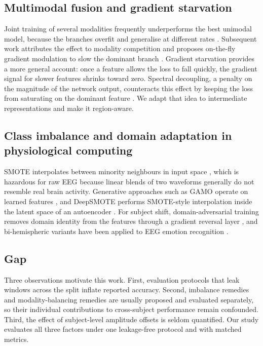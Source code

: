 \documentclass[a4paper,fleqn]{cas-sc}
\begin{document}
\subsection{Multimodal fusion and gradient starvation}
Joint training of several modalities frequently underperforms the best unimodal model, because the branches overfit and generalise at different rates \citep{wang2020makes}. Subsequent work attributes the effect to modality competition and proposes on-the-fly gradient modulation to slow the dominant branch \citep{peng2022balanced,huang2022modality}. Gradient starvation provides a more general account: once a feature allows the loss to fall quickly, the gradient signal for slower features shrinks toward zero. Spectral decoupling, a penalty on the magnitude of the network output, counteracts this effect by keeping the loss from saturating on the dominant feature \citep{pezeshki2021gradient}. We adapt that idea to intermediate representations and make it region-aware.

\subsection{Class imbalance and domain adaptation in physiological computing}
SMOTE interpolates between minority neighbours in input space \citep{chawla2002smote}, which is hazardous for raw EEG because linear blends of two waveforms generally do not resemble real brain activity. Generative approaches such as GAMO operate on learned features \citep{mullick2019gamo}, and DeepSMOTE performs SMOTE-style interpolation inside the latent space of an autoencoder \citep{dablain2023deepsmote}. For subject shift, domain-adversarial training removes domain identity from the features through a gradient reversal layer \citep{ganin2016dann}, and bi-hemispheric variants have been applied to EEG emotion recognition \citep{li2021bidann}.

\subsection{Gap}
Three observations motivate this work. First, evaluation protocols that leak windows across the split inflate reported accuracy. Second, imbalance remedies and modality-balancing remedies are usually proposed and evaluated separately, so their individual contributions to cross-subject performance remain confounded. Third, the effect of subject-level amplitude offsets is seldom quantified. Our study evaluates all three factors under one leakage-free protocol and with matched metrics.
\end{document}
